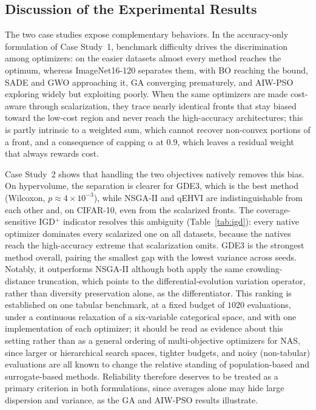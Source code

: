 \documentclass[runningheads]{llncs}
\begin{document}
\subsection{Discussion of the Experimental Results} \label{SEC4.4}
The two case studies expose complementary behaviors. In the accuracy-only formulation of Case Study~1, benchmark difficulty drives the discrimination among optimizers: on the easier datasets almost every method reaches the optimum, whereas ImageNet16-120 separates them, with BO reaching the bound, SADE and GWO approaching it, GA converging prematurely, and AIW-PSO exploring widely but exploiting poorly. When the same optimizers are made cost-aware through scalarization, they trace nearly identical fronts that stay biased toward the low-cost region and never reach the high-accuracy architectures; this is partly intrinsic to a weighted sum, which cannot recover non-convex portions of a front, and a consequence of capping $\alpha$ at $0.9$, which leaves a residual weight that always rewards cost. 

Case Study~2 shows that handling the two objectives natively removes this bias. On hypervolume, the separation is clearer for GDE3, which is the best method (Wilcoxon, $p \approx 4{\times}10^{-3}$), while NSGA-II and qEHVI are indistinguishable from each other and, on CIFAR-10, even from the scalarized fronts. The coverage-sensitive IGD$^{+}$ indicator resolves this ambiguity (Table~\ref{tab:igd}): every native optimizer dominates every scalarized one on all datasets, because the natives reach the high-accuracy extreme that scalarization omits. GDE3 is the strongest method overall, pairing the smallest gap with the lowest variance across seeds. Notably, it outperforms NSGA-II although both apply the same crowding-distance truncation, which points to the differential-evolution variation operator, rather than diversity preservation alone, as the differentiator. This ranking is established on one tabular benchmark, at a fixed budget of $1020$ evaluations, under a continuous relaxation of a six-variable categorical space, and with one implementation of each optimizer; it should be read as evidence about this setting rather than as a general ordering of multi-objective optimizers for NAS, since larger or hierarchical search spaces, tighter budgets, and noisy (non-tabular) evaluations are all known to change the relative standing of population-based and surrogate-based methods. Reliability therefore deserves to be treated as a primary criterion in both formulations, since averages alone may hide large dispersion and variance, as the GA and AIW-PSO results illustrate. 
\end{document}
